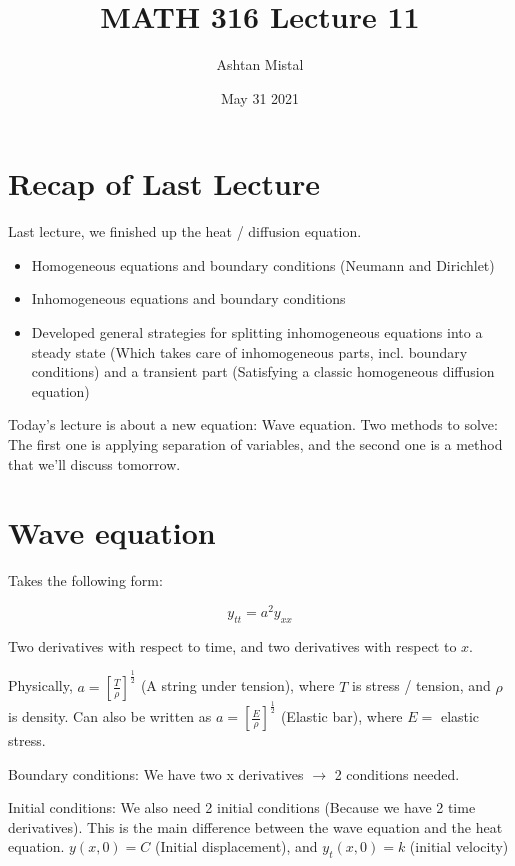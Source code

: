 \documentclass{article}
\title{MATH 316 Lecture 11}
\author{Ashtan Mistal}
\date{May 31 2021}
\begin{document}
\ifstandalone
\maketitle
\fi

\graphicspath{{./Lecture11/}}

\section{Recap of Last Lecture}

Last lecture, we finished up the heat / diffusion equation. 

\begin{itemize}
    \item Homogeneous equations and boundary conditions (Neumann and Dirichlet)
    \item Inhomogeneous equations and boundary conditions
    \item Developed general strategies for splitting inhomogeneous equations into a steady state (Which takes care of inhomogeneous parts, incl. boundary conditions) and a transient part (Satisfying a classic homogeneous diffusion equation)
\end{itemize}

Today's lecture is about a new equation: Wave equation. Two methods to solve: The first one is applying separation of variables, and the second one is a method that we'll discuss tomorrow. 

\section{Wave equation}

Takes the following form:

$$y_{tt} = a^2 y_{xx}$$

Two derivatives with respect to time, and two derivatives with respect to $x$. 

Physically, $a = \left[ \frac{T}{\rho} \right]^{\frac{1}{2}}$ (A string under tension), where $T$ is stress / tension, and $\rho$ is density. Can also be written as $a = \left[ \frac{E}{\rho} \right]^{\frac{1}{2}}$ (Elastic bar), where $E = $ elastic stress. 

Boundary conditions: We have two x derivatives $\to$ 2 conditions needed. 

Initial conditions: We also need 2 initial conditions (Because we have 2 time derivatives). This is the main difference between the wave equation and the heat equation.  $y(x,0) = C$ (Initial displacement), and $y_t(x,0) = k$ (initial velocity)
\end{document}
